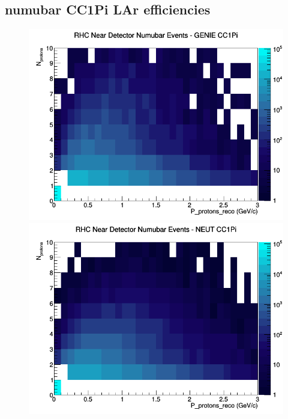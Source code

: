 \subsection{numubar CC1Pi LAr efficiencies}
\begin{figure}[h]
\includegraphics[width=\linewidth]{eff_N_P/LAr/protons/CC1Pi_RHC_ND_numubar_N_P_GENIE.png}
\endminipage
{}
\includegraphics[width=\linewidth]{eff_N_P/LAr/protons/CC1Pi_RHC_ND_numubar_N_P_NEUT.png}
\endminipage
{}

\end{figure}
